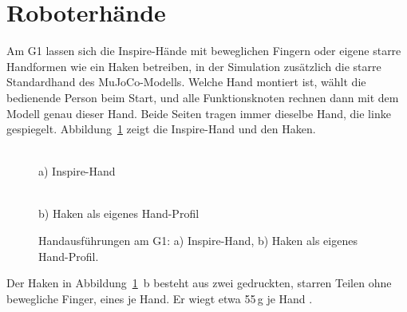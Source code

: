 \section{Roboterhände}
\label{sec:haende}
Am G1 lassen sich die Inspire-Hände mit beweglichen Fingern oder eigene starre Handformen wie ein Haken betreiben, in der Simulation zusätzlich die starre Standardhand des MuJoCo-Modells.
Welche Hand montiert ist, wählt die bedienende Person beim Start, und alle Funktionsknoten rechnen dann mit dem Modell genau dieser Hand.
Beide Seiten tragen immer dieselbe Hand, die linke gespiegelt.
Abbildung~\ref{fig:haende} zeigt die Inspire-Hand und den Haken.

\begin{figure}[htbp]
  \centering
  \begin{minipage}[t]{0.48\textwidth}
    \centering
    \\[1mm]
    {\small a) Inspire-Hand}
  \end{minipage}\hfill
  \begin{minipage}[t]{0.48\textwidth}
    \centering
    \\[1mm]
    {\small b) Haken als eigenes Hand-Profil}
  \end{minipage}
  \caption[Handausführungen am G1]{Handausführungen am G1: a) Inspire-Hand, b) Haken als eigenes Hand-Profil.}
  \label{fig:haende}
\end{figure}


Der Haken in Abbildung~\ref{fig:haende}~b besteht aus zwei gedruckten, starren Teilen ohne bewegliche Finger, eines je Hand.
Er wiegt etwa 55\,g je Hand .

